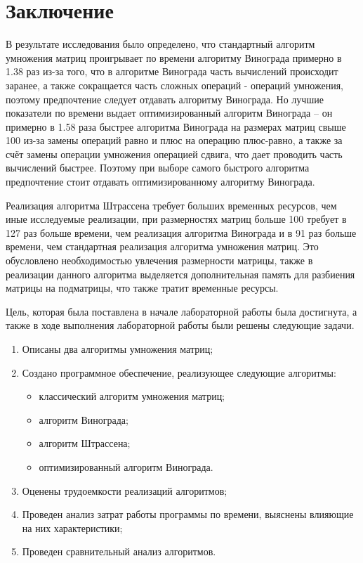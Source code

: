 \chapter*{Заключение}

В результате исследования было определено, что стандартный алгоритм умножения матриц проигрывает по времени алгоритму Винограда примерно в 1.38 раз из-за того, что в алгоритме Винограда часть вычислений происходит заранее, а также сокращается часть сложных операций - операций умножения, поэтому предпочтение следует отдавать алгоритму Винограда. 
Но лучшие показатели по времени выдает оптимизированный алгоритм Винограда -- он примерно в 1.58 раза быстрее алгоритма Винограда на размерах матриц свыше 100 из-за замены операций равно и плюс на операцию плюс-равно, а также за счёт замены операции умножения операцией сдвига, что дает проводить часть вычислений быстрее. 
Поэтому при выборе самого быстрого алгоритма предпочтение стоит отдавать оптимизированному алгоритму Винограда. 

Реализация алгоритма Штрассена требует больших временных ресурсов, чем иные исследуемые реализации, при размерностях матриц больше 100 требует в 127 раз больше времени, чем реализация алгоритма Винограда и в 91 раз больше времени, чем стандартная реализация алгоритма умножения матриц. Это обусловлено необходимостью увлечения размерности матрицы, также в реализации данного алгоритма выделяется дополнительная память для разбиения матрицы на подматрицы, что также тратит временные ресурсы.

Цель, которая была поставлена в начале лабораторной работы была достигнута, а также в ходе выполнения лабораторной работы были решены следующие задачи.
\begin{enumerate}[label={\arabic*)}]
	\item Описаны два алгоритмы умножения матриц;
	\item Создано программное обеспечение, реализующее следующие алгоритмы:
	\begin{itemize}[label=---]
		\item классический алгоритм умножения матриц;
		\item алгоритм Винограда;
		\item алгоритм Штрассена;
		\item оптимизированный алгоритм Винограда.
	\end{itemize}
	\item Оценены трудоемкости реализаций алгоритмов;
	\item Проведен анализ затрат работы программы по времени, выяснены влияющие на них характеристики;
	\item Проведен сравнительный анализ алгоритмов.
\end{enumerate}